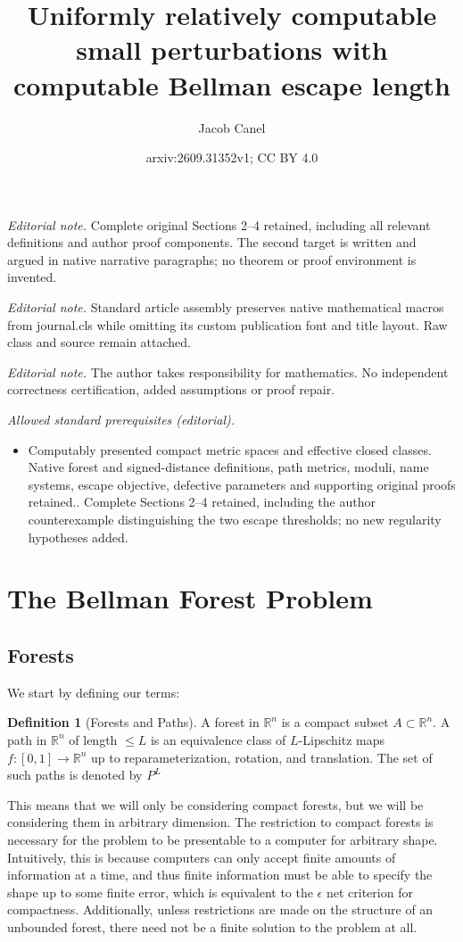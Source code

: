 \documentclass[10pt,a4paper]{article}
\title{Uniformly relatively computable small perturbations with computable Bellman escape length}
\author{Jacob Canel}
\date{arxiv:2609.31352v1; CC BY 4.0}
\theoremstyle{definition}
\newtheorem{dfn}[thm]{Definition}
\def\R{\mathbb{R}}
\begin{document}
\maketitle
\noindent\textit{Editorial note.} Complete original Sections 2--4 retained, including all relevant definitions and author proof components. The second target is written and argued in native narrative paragraphs; no theorem or proof environment is invented.\par\medskip
\noindent\textit{Editorial note.} Standard article assembly preserves native mathematical macros from journal.cls while omitting its custom publication font and title layout. Raw class and source remain attached.\par\medskip
\noindent\textit{Editorial note.} The author takes responsibility for mathematics. No independent correctness certification, added assumptions or proof repair.\par\medskip
\noindent\textit{Allowed standard prerequisites (editorial).}\begin{itemize}
\item Computably presented compact metric spaces and effective closed classes. Native forest and signed-distance definitions, path metrics, moduli, name systems, escape objective, defective parameters and supporting original proofs retained.. Complete Sections 2--4 retained, including the author counterexample distinguishing the two escape thresholds; no new regularity hypotheses added.
\end{itemize}\medskip
\section{The Bellman Forest Problem}
\label{sec:two}
\subsection{Forests}
\label{sec:forests}
We start by defining our terms:
\begin{dfn}[Forests and Paths]
A forest in $\R^n$ is a compact subset $A\subset\R^n$. A path in $\R^n$ of length $\leq L$ is an equivalence class of $L$-Lipschitz maps $f:[0,1]\rightarrow \R^n$ up to reparameterization, rotation, and translation. The set of such paths is denoted by $P^L$
\end{dfn}
\label{dfn:forpath}
This means that we will only be considering compact forests, but we will be considering them in arbitrary dimension. The restriction to compact forests is necessary for the problem to be presentable to a computer for arbitrary shape. Intuitively, this is because computers can only accept finite amounts of information at a time, and thus finite information must be able to specify the shape up to some finite error, which is equivalent to the $\epsilon$ net criterion for compactness. Additionally, unless restrictions are made on the structure of an unbounded forest, there need not be a finite solution to the problem at all. 
\end{document}
